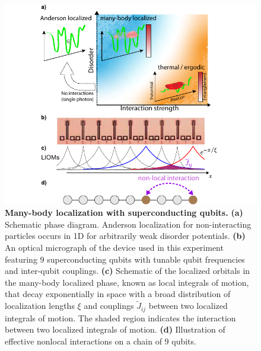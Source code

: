 \begin{figure}[t]
    \centering
    \hspace*{-25pt}
    \includegraphics[width=150 mm,keepaspectratio]{./PDF/f1_190716_1106a.pdf}
    \caption{\small
    \textbf{Many-body localization with superconducting qubits.}
    \textbf{(a)} Schematic phase diagram.
    Anderson localization for non-interacting particles occurs in 1D for arbitrarily weak disorder potentials.
    \textbf{(b)} An optical micrograph of the device used in this experiment featuring $9$ superconducting qubits with tunable qubit frequencies and inter-qubit couplings.
    \textbf{(c)} Schematic of the localized orbitals in the many-body localized phase, known as local integrals of motion, that decay exponentially in space with a broad distribution of localization lengths $\xi$ and couplings $\widetilde{J}_{ij}$ between two localized integrals of motion.
    The shaded region indicates the interaction between two localized integrals of motion.
    \textbf{(d)} Illustration of effective nonlocal interactions on a chain of $9$ qubits.
    }
    \label{fig_1}
\end{figure}

